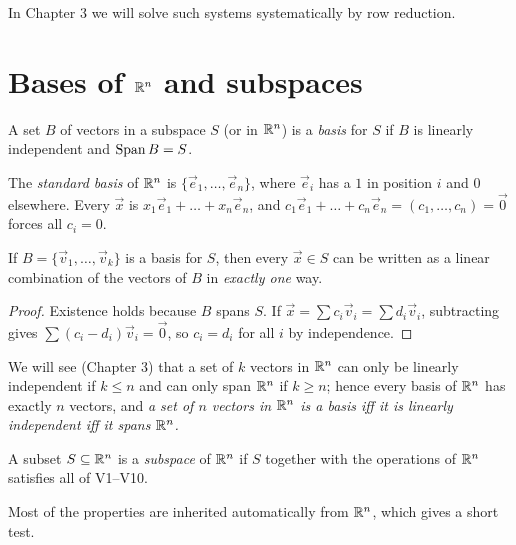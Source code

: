 In Chapter 3 we will solve such systems systematically by row reduction.

\section{Bases of $\mathbb{R}^n$ and subspaces}

\begin{definition}[Basis]
A set $B$ of vectors in a subspace $S$ (or in $\mathbb{R}^n$) is a \emph{basis} for $S$ if $B$ is
linearly independent and $\operatorname{Span} B = S$.
\end{definition}

\begin{example}
The \emph{standard basis} of $\mathbb{R}^n$ is $\{\vec e_1,\dots,\vec e_n\}$, where $\vec e_i$ has a $1$ in
position $i$ and $0$ elsewhere. Every $\vec x$ is $x_1\vec e_1+\dots+x_n\vec e_n$, and
$c_1\vec e_1+\dots+c_n\vec e_n=(c_1,\dots,c_n)=\vec 0$ forces all $c_i=0$.
\end{example}

\begin{theorem}
If $B=\{\vec v_1,\dots,\vec v_k\}$ is a basis for $S$, then every $\vec x\in S$ can be written
as a linear combination of the vectors of $B$ in \emph{exactly one} way.
\end{theorem}
\begin{proof}
Existence holds because $B$ spans $S$. If $\vec x=\sum c_i\vec v_i=\sum d_i\vec v_i$, subtracting
gives $\sum(c_i-d_i)\vec v_i=\vec 0$, so $c_i=d_i$ for all $i$ by independence.
\end{proof}

We will see (Chapter 3) that a set of $k$ vectors in $\mathbb{R}^n$ can only be linearly independent
if $k\le n$ and can only span $\mathbb{R}^n$ if $k\ge n$; hence every basis of $\mathbb{R}^n$ has exactly $n$
vectors, and \emph{a set of $n$ vectors in $\mathbb{R}^n$ is a basis iff it is linearly independent iff
it spans $\mathbb{R}^n$.}

\begin{definition}[Subspace]
A subset $S\subseteq\mathbb{R}^n$ is a \emph{subspace} of $\mathbb{R}^n$ if $S$ together with the
operations of $\mathbb{R}^n$ satisfies all of V1--V10.
\end{definition}

Most of the properties are inherited automatically from $\mathbb{R}^n$, which gives a short test.

